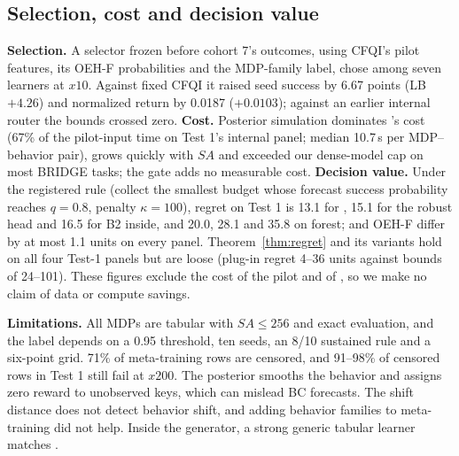 \begin{table}[t]
\centering
\caption{Development panels of OEH-F (IBS / LL). LB: simultaneous lower bound of the improvement over B2.}
\label{tab:replication}
\footnotesize
\setlength{\tabcolsep}{2.2pt}
\end{table}

\subsection{Selection, cost and decision value}
\label{sec:cost}
\textbf{Selection.} A selector frozen before cohort 7's outcomes, using CFQI's pilot features, its OEH-F probabilities and the MDP-family label, chose among seven learners at $x10$. Against fixed CFQI it raised seed success by 6.67 points (LB $+4.26$) and normalized return by 0.0187 ($+0.0103$); against an earlier internal router the bounds crossed zero. \textbf{Cost.} Posterior simulation dominates \OEH{}'s cost (67\% of the pilot-input time on Test 1's internal panel; median 10.7\,s per MDP--behavior pair), grows quickly with $SA$ and exceeded our dense-model cap on most BRIDGE tasks; the gate adds no measurable cost. \textbf{Decision value.} Under the registered rule (collect the smallest budget whose forecast success probability reaches $q=0.8$, penalty $\kappa=100$), regret on Test 1 is 13.1 for \OEH{}, 15.1 for the robust head and 16.5 for B2 inside, and 20.0, 28.1 and 35.8 on forest; \OEH{} and OEH-F differ by at most 1.1 units on every panel. Theorem~\ref{thm:regret} and its variants hold on all four Test-1 panels but are loose (plug-in regret 4--36 units against bounds of 24--101). These figures exclude the cost of the pilot and of \OEH{}, so we make no claim of data or compute savings.

\textbf{Limitations.} All MDPs are tabular with $SA\le256$ and exact evaluation, and the label depends on a 0.95 threshold, ten seeds, an 8/10 sustained rule and a six-point grid. 71\% of meta-training rows are censored, and 91--98\% of censored rows in Test 1 still fail at $x200$. The posterior smooths the behavior and assigns zero reward to unobserved keys, which can mislead BC forecasts. The shift distance does not detect behavior shift, and adding behavior families to meta-training did not help. Inside the generator, a strong generic tabular learner matches \OEH{}.
